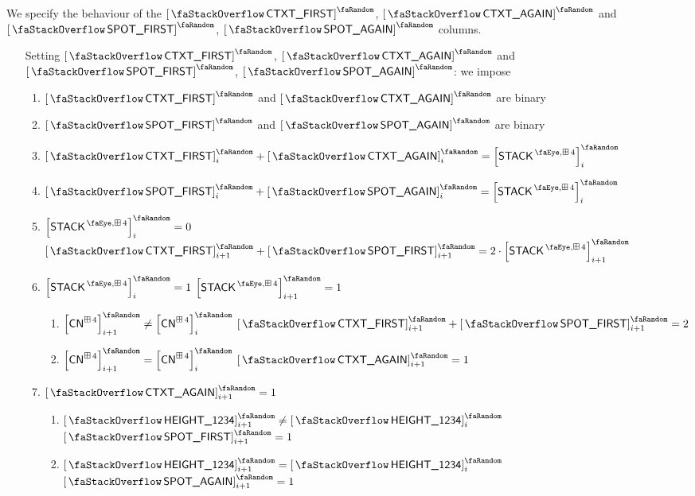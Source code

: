 We specify the behaviour of the $\stackContextFirst$, $\stackContextAgain$ and $\stackSpotFirst$, $\stackSpotAgain$ columns.
\begin{enumerate}
	\item[Setting $\stackContextFirst$, $\stackContextAgain$ and $\stackSpotFirst$, $\stackSpotAgain$:]
		we impose
		\begin{enumerate}
			\item $\stackContextFirst$ and $\stackContextAgain$ are binary
			\item $\stackSpotFirst$    and $\stackSpotAgain$    are binary
			\item $\stackContextFirst _{i} + \stackContextAgain _{i} = \order{\peekStackFour} _{i}$
			\item $\stackSpotFirst    _{i} + \stackSpotAgain    _{i} = \order{\peekStackFour} _{i}$
			\item \If $\order{\peekStackFour}_{i} = 0$ \Then $\stackContextFirst_{i + 1} + \stackSpotFirst_{i + 1} = 2 \cdot \order{\peekStackFour}_{i + 1}$
			\item \If $\order{\peekStackFour}_{i} = 1$ \et $\order{\peekStackFour}_{i + 1} = 1$ \Then
				\begin{enumerate}
					\item \If $\order{\cn^{\cc4}}_{i + 1} \neq \order{\cn^{\cc4}}_{i}$ \Then $\stackContextFirst_{i + 1} + \stackSpotFirst_{i + 1} = 2$
					\item \If $\order{\cn^{\cc4}}_{i + 1} =    \order{\cn^{\cc4}}_{i}$ \Then $\stackContextAgain_{i + 1} = 1$
				\end{enumerate}
			\item \If $\stackContextAgain_{i + 1} = 1$ \Then
				\begin{enumerate}
					\item \If $\order{\stackItemHeight{\col{1234}}}_{i + 1} \neq \order{\stackItemHeight{\col{1234}}}_{i}$ \Then $\stackSpotFirst_{i + 1} = 1$
					\item \If $\order{\stackItemHeight{\col{1234}}}_{i + 1} =    \order{\stackItemHeight{\col{1234}}}_{i}$ \Then $\stackSpotAgain_{i + 1} = 1$
				\end{enumerate}
		\end{enumerate}
\end{enumerate}
